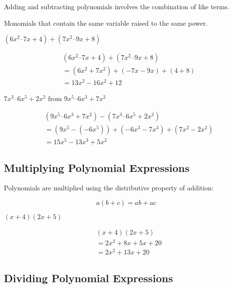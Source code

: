 \documentclass[english,course]{lecture}
\begin{document}
Adding and subtracting polynomials involves the combination of like terms.

\begin{definition}
	Monomials that contain the same variable raised to the same power.
\end{definition}

\begin{example}[Simplify]
	$(6x^2 – 7x + 4) + (7x^2 – 9x + 8)$


	\begin{align*}
		  & (6x^2 – 7x + 4) + (7x^2 – 9x + 8)      \\
		  & = (6x^2 + 7x^2) + (-7x - 9x) + (4 + 8) \\
		  & = 13x^2 - 16x^2 + 12
	\end{align*}
\end{example}

\begin{example}[Subtract]
	$7x^3 – 6x^5 + 2x^2$ from $9x^5 – 6x^3 + 7x^2$


	\begin{align*}
		  & (9x^5 – 6x^3 + 7x^2) - (7x^3 – 6x^5 + 2x^2)         \\
		  & = (9x^5 - (-6x^5)) + (-6x^3 - 7x^3) + (7x^2 - 2x^2) \\
		  & = 15x^5 - 13x^3 + 5x^2
	\end{align*}
\end{example}

\subsection{Multiplying Polynomial Expressions}

Polynomials are multiplied using the distributive property of addition:

$$
	a(b + c) = ab + ac
$$

\begin{example}[Simplify]
	$(x + 4)(2x + 5)$


	\begin{align*}
		  & (x + 4)(2x + 5)       \\
		  & = 2x^2 + 8x + 5x + 20 \\
		  & = 2x^2 + 13x + 20
	\end{align*}
\end{example}

\subsection{Dividing Polynomial Expressions}
\end{document}
